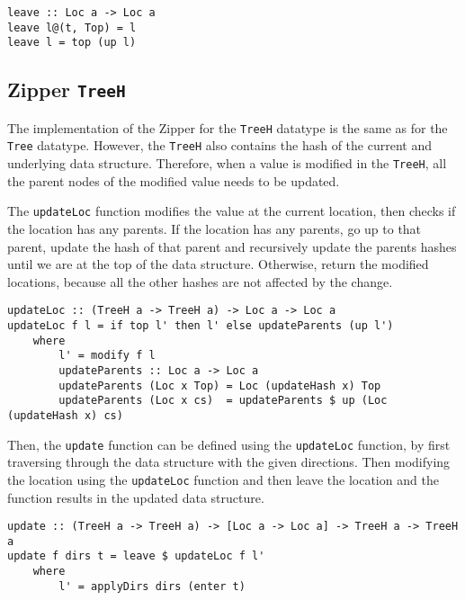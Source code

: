 \begin{verbatim}
leave :: Loc a -> Loc a
leave l@(t, Top) = l
leave l = top (up l)
\end{verbatim}

\subsection{Zipper \texttt{TreeH}}
\label{subsec-zipper-treeh}

The implementation of the Zipper for the \texttt{TreeH} datatype is the same as for the \texttt{Tree} datatype. However, the \texttt{TreeH} also contains the hash of the current and underlying data structure. Therefore, when a value is modified in the \texttt{TreeH}, all the parent nodes of the modified value needs to be updated. 

The \texttt{updateLoc} function modifies the value at the current location, then checks if the location has any parents. If the location has any parents, go up to that parent, update the hash of that parent and recursively update the parents hashes until we are at the top of the data structure. Otherwise, return the modified locations, because all the other hashes are not affected by the change. 

\begin{verbatim}
updateLoc :: (TreeH a -> TreeH a) -> Loc a -> Loc a
updateLoc f l = if top l' then l' else updateParents (up l')
    where
        l' = modify f l
        updateParents :: Loc a -> Loc a
        updateParents (Loc x Top) = Loc (updateHash x) Top
        updateParents (Loc x cs)  = updateParents $ up (Loc (updateHash x) cs)
\end{verbatim}

Then, the \texttt{update} function can be defined using the \texttt{updateLoc} function, by first traversing through the data structure with the given directions. Then modifying the location using the \texttt{updateLoc} function and then leave the location and the function results in the updated data structure.

\begin{verbatim}
update :: (TreeH a -> TreeH a) -> [Loc a -> Loc a] -> TreeH a -> TreeH a 
update f dirs t = leave $ updateLoc f l'
    where
        l' = applyDirs dirs (enter t)
\end{verbatim}